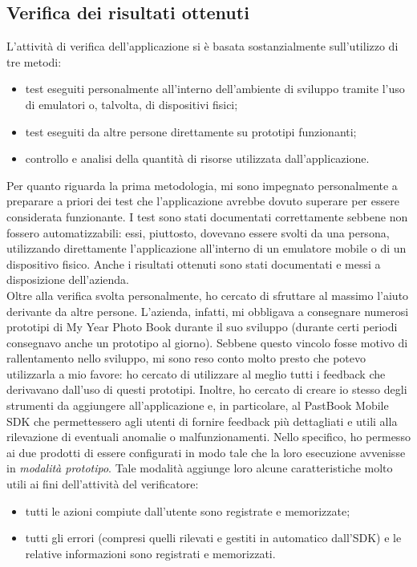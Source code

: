 		\subsection{Verifica dei risultati ottenuti}
			L'attività di verifica dell'applicazione si è basata sostanzialmente sull'utilizzo di tre metodi:
			\begin{itemize}
				\item test eseguiti personalmente all'interno dell'ambiente di sviluppo tramite l'uso di emulatori o, talvolta, di
				dispositivi fisici;
				\item test eseguiti da altre persone direttamente su prototipi funzionanti;
				\item controllo e analisi della quantità di risorse utilizzata dall'applicazione.
			\end{itemize}
			Per quanto riguarda la prima metodologia, mi sono impegnato personalmente a preparare a priori dei test che l'applicazione
			avrebbe dovuto superare per essere considerata funzionante. I test sono stati documentati correttamente sebbene non fossero
			automatizzabili: essi, piuttosto, dovevano essere svolti da una persona, utilizzando direttamente l'applicazione all'interno
			di un emulatore mobile o di un dispositivo fisico. Anche i risultati ottenuti sono stati documentati e messi a disposizione
			dell'azienda.\\
			Oltre alla verifica svolta personalmente, ho cercato di sfruttare al massimo l'aiuto derivante da altre persone. L'azienda,
			infatti, mi obbligava a consegnare numerosi prototipi di My Year Photo Book durante il suo sviluppo (durante certi periodi
			consegnavo anche un prototipo al giorno). Sebbene questo vincolo fosse motivo di rallentamento nello sviluppo, mi sono reso
			conto molto presto che potevo utilizzarla a mio favore: ho cercato di utilizzare al meglio tutti i feedback che derivavano
			dall'uso di questi prototipi. Inoltre, ho cercato di creare io stesso degli strumenti da aggiungere all'applicazione e,
			in particolare, al PastBook Mobile SDK che permettessero agli utenti di fornire feedback più dettagliati e utili alla
			rilevazione di eventuali anomalie o malfunzionamenti. Nello specifico, ho permesso ai due prodotti di essere configurati
			in modo tale che la loro esecuzione avvenisse in \emph{modalità prototipo}. Tale modalità aggiunge loro alcune
			caratteristiche molto utili ai fini dell'attività del verificatore:
			\begin{itemize}
				\item tutti le azioni compiute dall'utente sono registrate e memorizzate;
				\item tutti gli errori (compresi quelli rilevati e gestiti in automatico dall'SDK) e le relative informazioni sono
				registrati e memorizzati.
			\end{itemize}
